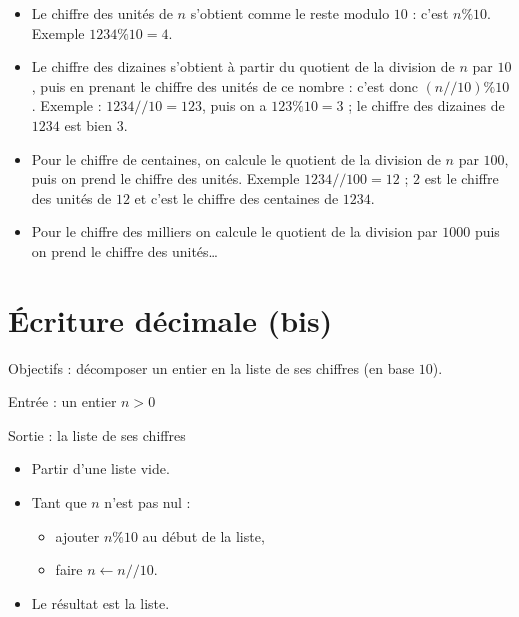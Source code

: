\documentclass[11pt,class=report,crop=false]{standalone}
\begin{document}
\bigskip

  \begin{itemize}
    \item Le chiffre des unités de $n$ s'obtient comme le reste modulo $10$ : c'est $n\%10$. Exemple $1234 \% 10 = 4$.
 
\bigskip   
    \item Le chiffre des dizaines s'obtient à partir du quotient de la division de $n$ par $10$, puis en prenant le chiffre des unités de ce nombre : c'est donc $(n // 10) \% 10$.
   Exemple : $1234 // 10 = 123$, puis on a $123 \% 10 = 3$ ; le chiffre des dizaines de $1234$ est bien $3$.
   
\bigskip
   \item Pour le chiffre de centaines, on calcule le quotient de la division de $n$ par $100$, puis on prend le chiffre des unités.  Exemple $1234 // 100 = 12$ ; $2$ est le chiffre des unités de $12$ et c'est le chiffre des centaines de $1234$. 
 
\bigskip  
   \item Pour le chiffre des milliers on calcule le quotient de la division par $1000$ puis on prend le chiffre des unités\ldots
   \end{itemize} 

   
   \newpage
   
\section*{\'Ecriture décimale (bis)}   

Objectifs : décomposer un entier en la liste de ses chiffres (en base $10$).


  \begin{algorithme}
  Entrée : un entier $n>0$

  Sortie : la liste de ses chiffres 

  \begin{itemize}
    \item Partir d'une liste vide.
    
    \item Tant que $n$ n'est pas nul :
    
     \begin{itemize} 
       \item ajouter $n \% 10$ au début de la liste,
       \item faire $n \leftarrow n//10$.
     \end{itemize}    
         
    \item Le résultat est la liste.
  \end{itemize} 
             
 \end{algorithme}
\end{document}
